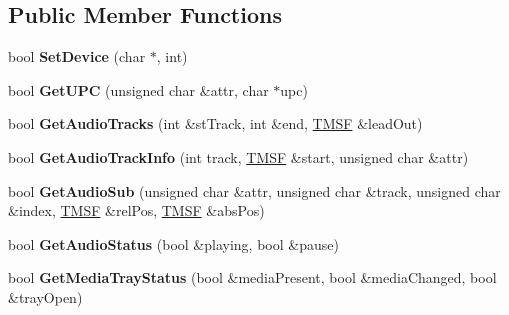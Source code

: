 \subsection*{Public Member Functions}
\begin{DoxyCompactItemize}
\item 
\hypertarget{classCDROM__Interface__Fake_a344218a4e5ac24ad7ea549a6440e9e19}{bool {\bfseries Set\-Device} (char $\ast$, int)}\label{classCDROM__Interface__Fake_a344218a4e5ac24ad7ea549a6440e9e19}

\item 
\hypertarget{classCDROM__Interface__Fake_a3304c3e7cd241800d4bcba5faf888f96}{bool {\bfseries Get\-U\-P\-C} (unsigned char \&attr, char $\ast$upc)}\label{classCDROM__Interface__Fake_a3304c3e7cd241800d4bcba5faf888f96}

\item 
\hypertarget{classCDROM__Interface__Fake_a14881cfccb40e1cd1e00293a43ede7cd}{bool {\bfseries Get\-Audio\-Tracks} (int \&st\-Track, int \&end, \hyperlink{structSMSF}{T\-M\-S\-F} \&lead\-Out)}\label{classCDROM__Interface__Fake_a14881cfccb40e1cd1e00293a43ede7cd}

\item 
\hypertarget{classCDROM__Interface__Fake_a13b02db8a3ee1fd99124d5dfd5508021}{bool {\bfseries Get\-Audio\-Track\-Info} (int track, \hyperlink{structSMSF}{T\-M\-S\-F} \&start, unsigned char \&attr)}\label{classCDROM__Interface__Fake_a13b02db8a3ee1fd99124d5dfd5508021}

\item 
\hypertarget{classCDROM__Interface__Fake_a28034819e3365729f6bdef40c4cf940a}{bool {\bfseries Get\-Audio\-Sub} (unsigned char \&attr, unsigned char \&track, unsigned char \&index, \hyperlink{structSMSF}{T\-M\-S\-F} \&rel\-Pos, \hyperlink{structSMSF}{T\-M\-S\-F} \&abs\-Pos)}\label{classCDROM__Interface__Fake_a28034819e3365729f6bdef40c4cf940a}

\item 
\hypertarget{classCDROM__Interface__Fake_a600834e869be578a320c719b26ab2e93}{bool {\bfseries Get\-Audio\-Status} (bool \&playing, bool \&pause)}\label{classCDROM__Interface__Fake_a600834e869be578a320c719b26ab2e93}

\item 
\hypertarget{classCDROM__Interface__Fake_a97677cbe31ed7fb3f777fcaa7307bcba}{bool {\bfseries Get\-Media\-Tray\-Status} (bool \&media\-Present, bool \&media\-Changed, bool \&tray\-Open)}\label{classCDROM__Interface__Fake_a97677cbe31ed7fb3f777fcaa7307bcba}


\end{DoxyCompactItemize}
